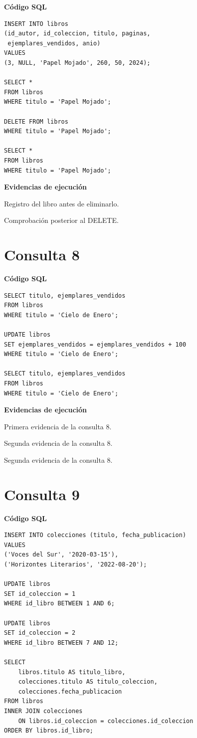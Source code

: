 \textbf{Código SQL}

\begin{lstlisting}
INSERT INTO libros
(id_autor, id_coleccion, titulo, paginas,
 ejemplares_vendidos, anio)
VALUES
(3, NULL, 'Papel Mojado', 260, 50, 2024);

SELECT *
FROM libros
WHERE titulo = 'Papel Mojado';

DELETE FROM libros
WHERE titulo = 'Papel Mojado';

SELECT *
FROM libros
WHERE titulo = 'Papel Mojado';
\end{lstlisting}

\textbf{Evidencias de ejecución}

{Registro del libro antes de eliminarlo.}

{Comprobación posterior al DELETE.}


\clearpage
\section*{Consulta 8}

\textbf{Código SQL}

\begin{lstlisting}
SELECT titulo, ejemplares_vendidos
FROM libros
WHERE titulo = 'Cielo de Enero';

UPDATE libros
SET ejemplares_vendidos = ejemplares_vendidos + 100
WHERE titulo = 'Cielo de Enero';

SELECT titulo, ejemplares_vendidos
FROM libros
WHERE titulo = 'Cielo de Enero';
\end{lstlisting}

\textbf{Evidencias de ejecución}

{Primera evidencia de la consulta 8.}

{Segunda evidencia de la consulta 8.}

{Segunda evidencia de la consulta 8.}



\clearpage
\section*{Consulta 9}

\textbf{Código SQL}

\begin{lstlisting}
INSERT INTO colecciones (titulo, fecha_publicacion)
VALUES
('Voces del Sur', '2020-03-15'),
('Horizontes Literarios', '2022-08-20');

UPDATE libros
SET id_coleccion = 1
WHERE id_libro BETWEEN 1 AND 6;

UPDATE libros
SET id_coleccion = 2
WHERE id_libro BETWEEN 7 AND 12;

SELECT
    libros.titulo AS titulo_libro,
    colecciones.titulo AS titulo_coleccion,
    colecciones.fecha_publicacion
FROM libros
INNER JOIN colecciones
    ON libros.id_coleccion = colecciones.id_coleccion
ORDER BY libros.id_libro;
\end{lstlisting}

